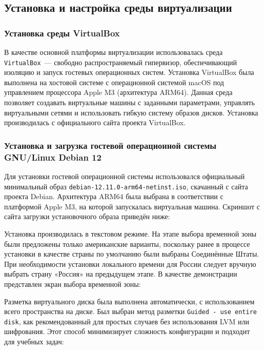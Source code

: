 \subsection{Установка и настройка среды виртуализации}

\subsubsection{Установка среды VirtualBox}

В качестве основной платформы виртуализации использовалась среда \texttt{VirtualBox}~--- свободно распространяемый гипервизор, обеспечивающий изоляцию и запуск гостевых операционных систем. Установка VirtualBox была выполнена на хостовой системе с операционной системой macOS под управлением процессора Apple M3 (архитектура ARM64). Данная среда позволяет создавать виртуальные машины с заданными параметрами, управлять виртуальными сетями и использовать гибкую систему образов дисков. Установка производилась с официального сайта проекта VirtualBox.

\subsubsection{Установка и загрузка гостевой операционной системы GNU/Linux Debian 12}

Для установки гостевой операционной системы использовался официальный минимальный образ \texttt{debian-12.11.0-arm64-netinst.iso}, скачанный с сайта проекта Debian. Архитектура ARM64 была выбрана в соответствии с платформой Apple M3, на которой запускалась виртуальная машина. Скриншот с сайта загрузки установочного образа приведён ниже:


Установка производилась в текстовом режиме. На этапе выбора временной зоны были предложены только американские варианты, поскольку ранее в процессе установки в качестве страны по умолчанию были выбраны Соединённые Штаты. При необходимости установки локального времени для России следует вручную выбрать страну «Россия» на предыдущем этапе. В качестве демонстрации представлен экран выбора временной зоны:


Разметка виртуального диска была выполнена автоматически, с использованием всего пространства на диске. Был выбран метод разметки \texttt{Guided - use entire disk}, как рекомендованный для простых случаев без использования LVM или шифрования. Этот способ минимизирует сложность конфигурации и подходит для учебных задач:

